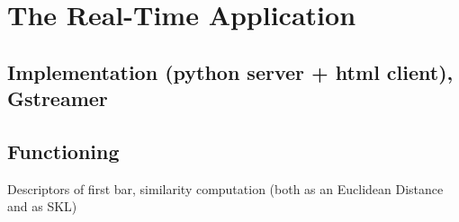 \chapter{The Real-Time Application} %

\label{Chapter6} %


\section{Implementation (python server + html client), Gstreamer}
\section{Functioning}
Descriptors of first bar, similarity computation (both as an Euclidean Distance and as SKL)